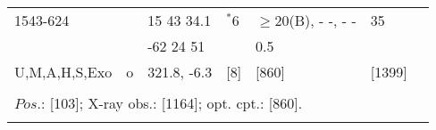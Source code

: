 \documentclass{aa}
\begin{document}
\begin{tabular}{p{2.5cm}p{1cm}p{1.8cm}p{2.3cm}p{3.3cm}p{2.0cm}p{2.2cm}}
\noalign{\smallskip}
1543-624               &           & 15 43 34.1         &  $^*$6           & $\geq$20(B), - -, - -       & 35               &          \\
                                &           & -62 24 51           &                        & 0.5                                   &                     &    \\
U,M,A,H,S,Exo     & o       & 321.8, -6.3         & [8]                  & [860]                               & [1399]         &         \\
\\
\multicolumn{7}{p{17.5cm}}{
$Pos$.: [103]; X-ray obs.: [1164]; opt. cpt.: [860].}\\
\noalign{\smallskip}
\hline

\end{tabular}
\end{document}
